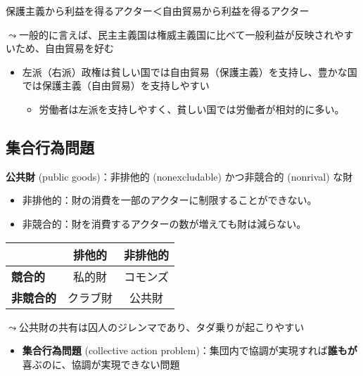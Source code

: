 \documentclass[
  xelatex,
  ja=standard]{bxjsarticle}
\providecommand{\tightlist}{%
  \setlength{\itemsep}{0pt}\setlength{\parskip}{0pt}}\usepackage{longtable,booktabs,array}
\begin{document}
保護主義から利益を得るアクター＜自由貿易から利益を得るアクター

\(\leadsto\)一般的に言えば、民主主義国は権威主義国に比べて一般利益が反映されやすいため、自由貿易を好む\citep{milner2005, kono2006}

\begin{itemize}
\tightlist
\item
  左派（右派）政権は貧しい国では自由貿易（保護主義）を支持し、豊かな国では保護主義（自由貿易）を支持しやすい\citep{dutt2002}

  \begin{itemize}
  \tightlist
  \item
    労働者は左派を支持しやすく、貧しい国では労働者が相対的に多い。
  \end{itemize}
\end{itemize}

\hypertarget{ux96c6ux5408ux884cux70baux554fux984c}{%
\subsection{集合行為問題}\label{ux96c6ux5408ux884cux70baux554fux984c}}

\textbf{公共財} (public goods)：非排他的 (nonexcludable) かつ非競合的
(nonrival) な財

\begin{itemize}
\tightlist
\item
  非排他的：財の消費を一部のアクターに制限することができない。
\item
  非競合的：財を消費するアクターの数が増えても財は減らない。
\end{itemize}

\begin{longtable}[]{@{}lcc@{}}
\toprule\noalign{}
& \textbf{排他的} & \textbf{非排他的} \\
\midrule\noalign{}
\endhead
\bottomrule\noalign{}
\endlastfoot
\textbf{競合的} & 私的財 & コモンズ \\
\textbf{非競合的} & クラブ財 & 公共財 \\
\end{longtable}

\(\leadsto\)公共財の共有は囚人のジレンマであり、タダ乗りが起こりやすい

\begin{itemize}
\tightlist
\item
  \textbf{集合行為問題} (collective action
  problem)：集団内で協調が実現すれば\textbf{誰もが}喜ぶのに、協調が実現できない問題
\end{itemize}
\end{document}
